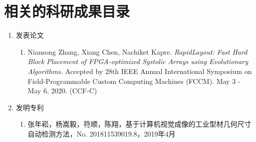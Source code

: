 \chapter{相关的科研成果目录}

\begin{enumerate}
	\item 发表论文
	\begin{enumerate}
		\item Niansong Zhang, Xiang Chen, Nachiket Kapre.
		 \textit{RapidLayout: Fast Hard Block Placement of FPGA-optimized Systolic Arrays using Evolutionary Algorithms.}
		 Accepted by 28th IEEE Annual International Symposium on Field-Programmable Custom Computing Machines (FCCM). 
		 May 3 - May 6, 2020. (CCF-C)
	\end{enumerate}
	\item 发明专利
	\begin{enumerate}
		\item 张年崧，杨嵩毅，符顺，陈翔，基于计算机视觉成像的工业型材几何尺寸自动检测方法，No. 201811539019.8，2019年4月
	\end{enumerate}
	
\end{enumerate}